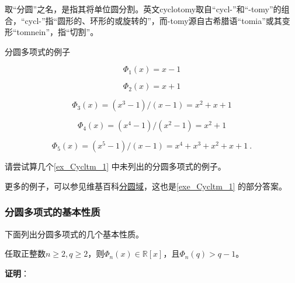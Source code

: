 取“分圆”之名，是指其将单位圆分割。英文cyclotomy取自“cycl-”和“-tomy”的组合，“cycl-”指“圆形的、环形的或旋转的”，而-tomy源自古希腊语“tomia”或其变形“tomnein”，指“切割”。




\begin{example}{分圆多项式的例子}\label{ex_Cycltm_1}

\begin{equation}
\Phi_1(x) = x-1
\end{equation}

\begin{equation}\label{eq_Cycltm_2}
\Phi_2(x) = x+1
\end{equation}

\begin{equation}
\Phi_3(x) = (x^3-1)/(x-1) = x^2+x+1
\end{equation}

\begin{equation}
\Phi_4(x) = (x^4-1)/(x^2-1) = x^2+1
\end{equation}

\begin{equation}
\Phi_5(x) = (x^5-1)/(x-1) = x^4+x^3+x^2+x+1~.
\end{equation}


\end{example}

\begin{exercise}{}\label{exe_Cycltm_1}
请尝试算几个\autoref{ex_Cycltm_1} 中未列出的分圆多项式的例子。
\end{exercise}

更多的例子，可以参见维基百科\href{https://en.wikipedia.org/wiki/Cyclotomic_polynomial#Examples}{分圆域}，这也是\autoref{exe_Cycltm_1} 的部分答案。





\subsubsection{分圆多项式的基本性质}


下面列出分圆多项式的几个基本性质。

\begin{theorem}{}
任取正整数$n\geq 2, q\geq 2$，则$\Phi_n(x)\in\mathbb{R}[x]$，且$\Phi_n(q)>q-1$。
\end{theorem}

\textbf{证明}：

